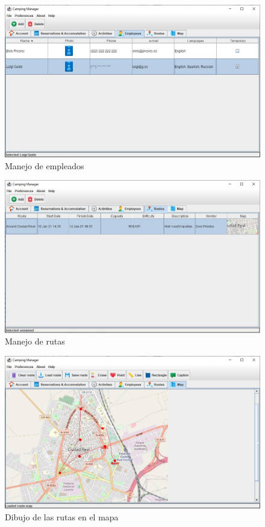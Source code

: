 \documentclass[a4paper]{article}
\begin{document}
\begin{figure}[h]
\includegraphics[width=\textwidth]{img/employees.jpg}
\caption{Manejo de empleados}
\end{figure}

\begin{figure}[h]
\includegraphics[width=\textwidth]{img/routes.jpg}
\caption{Manejo de rutas}
\end{figure}

\begin{figure}[h]
\includegraphics[width=\textwidth]{img/map.jpg}
\caption{Dibujo de las rutas en el mapa}
\end{figure}
\end{document}
